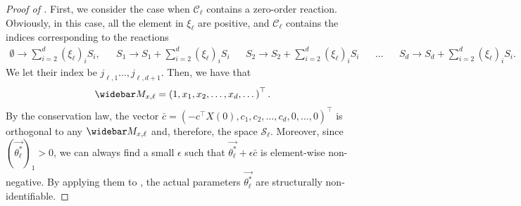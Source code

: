 \documentclass[pdflatex,sn-mathphys-num]{sn-jnl}%
\theoremstyle{thmstyleone}%
\theoremstyle{thmstyletwo}%
\theoremstyle{thmstylethree}%
\begin{document}
\begin{appendices}
\begin{proof}[Proof of ]
    First, we consider the case when $\mathcal C_\ell$ contains a zero-order reaction.  
    Obviously, in this case, all the element in $\xi_\ell$ are positive, and $\mathcal C_\ell$ contains the indices corresponding to the reactions 
    \begin{align*}
        \emptyset \to \sum_{i=2}^d (\xi_\ell)_i S_i, &&
        S_1 \to S_1 + \sum_{i=2}^d (\xi_\ell)_i S_i &&
        S_2 \to S_2 + \sum_{i=2}^d (\xi_\ell)_i S_i &&
        \dots
        &&
        S_d \to S_d + \sum_{i=2}^d (\xi_\ell)_i S_i. 
    \end{align*}
    We let their index be $j_{\ell,1}\dots, j_{\ell,d+1}$. 
    Then, we have that 
    \begin{align*}
        \widebar M_{x,\ell} 
        = \left(1, x_1, x_2,\dots, x_d, \dots\right)^{\top}.
    \end{align*}
    By the conservation law, the vector $\bar c = (-c^{\top} X(0), c_1,c_2,\dots, c_d, 0,\dots, 0)^{\top}$ is orthogonal to any $\widebar M_{x,\ell} $ and, therefore, the space $\mathcal S_\ell$. 
    Moreover, since $\left(\overrightarrow {\theta^*_\ell}\right)_1>0$, we can always find a small $\epsilon$ such that $\overrightarrow {\theta^*_\ell}+\epsilon \bar c $ is element-wise non-negative.
    By applying them to , the actual parameters $\overrightarrow {\theta^*_\ell}$ are structurally non-identifiable. 


\end{proof}
\end{appendices}
\end{document}
